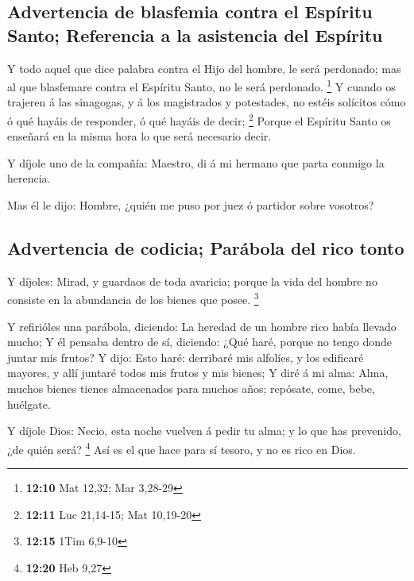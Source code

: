 \hypertarget{advertencia-de-blasfemia-contra-el-espuxedritu-santo-referencia-a-la-asistencia-del-espuxedritu}{%
\subsection{Advertencia de blasfemia contra el Espíritu Santo;
Referencia a la asistencia del
Espíritu}\label{advertencia-de-blasfemia-contra-el-espuxedritu-santo-referencia-a-la-asistencia-del-espuxedritu}}

 Y todo aquel que dice palabra contra el Hijo del hombre,
le será perdonado; mas al que blasfemare contra el Espíritu Santo, no le
será perdonado. \footnote{\textbf{12:10} Mat 12,32; Mar 3,28-29}
 Y cuando os trajeren á las sinagogas, y á los magistrados
y potestades, no estéis solícitos cómo ó qué hayáis de responder, ó qué
hayáis de decir; \footnote{\textbf{12:11} Luc 21,14-15; Mat 10,19-20}
 Porque el Espíritu Santo os enseñará en la misma hora lo
que será necesario decir.

 Y díjole uno de la compañía: Maestro, di á mi hermano que
parta conmigo la herencia.

 Mas él le dijo: Hombre, ¿quién me puso por juez ó partidor
sobre vosotros?

\hypertarget{advertencia-de-codicia-paruxe1bola-del-rico-tonto}{%
\subsection{Advertencia de codicia; Parábola del rico
tonto}\label{advertencia-de-codicia-paruxe1bola-del-rico-tonto}}

 Y díjoles: Mirad, y guardaos de toda avaricia; porque la
vida del hombre no consiste en la abundancia de los bienes que posee.
\footnote{\textbf{12:15} 1Tim 6,9-10}

 Y refirióles una parábola, diciendo: La heredad de un
hombre rico había llevado mucho;  Y él pensaba dentro de
sí, diciendo: ¿Qué haré, porque no tengo donde juntar mis frutos?
 Y dijo: Esto haré: derribaré mis alfolíes, y los edificaré
mayores, y allí juntaré todos mis frutos y mis bienes;  Y
diré á mi alma: Alma, muchos bienes tienes almacenados para muchos años;
repósate, come, bebe, huélgate.

 Y díjole Dios: Necio, esta noche vuelven á pedir tu alma;
y lo que has prevenido, ¿de quién será? \footnote{\textbf{12:20} Heb
  9,27}  Así es el que hace para sí tesoro, y no es rico en
Dios.

